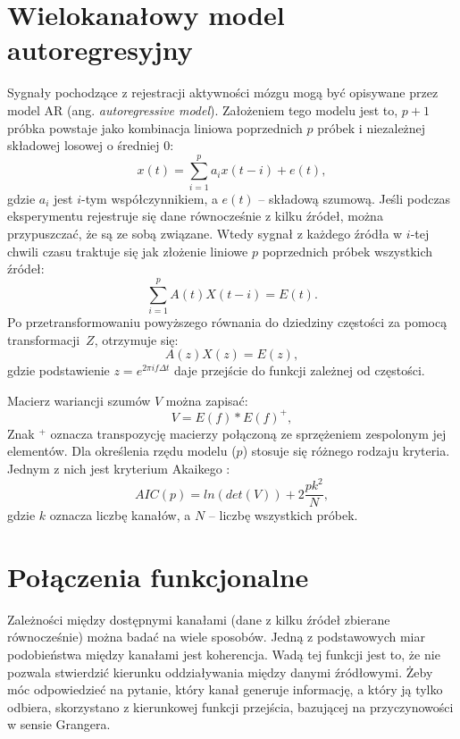 \documentclass{pracamgr}
\begin{document}
	\section{Wielokanałowy model autoregresyjny}
	Sygnały pochodzące z rejestracji aktywności mózgu mogą być opisywane przez model AR (ang. \textit{autoregressive model}). Założeniem tego modelu jest to, $p + 1$ próbka powstaje jako kombinacja liniowa poprzednich $p$ próbek i niezależnej składowej losowej o średniej 0:
	\begin{equation}
		x(t) =  \sum_{i=1}^{p}a_ix(t-i) + e(t),
	\end{equation}
	gdzie $a_i$ jest $i$-tym współczynnikiem, a $e(t)$ -- składową szumową. \newline
	Jeśli podczas eksperymentu rejestruje się dane równocześnie z kilku źródeł, można przypuszczać, że są ze sobą związane. Wtedy sygnał z każdego źródła w $i$-tej chwili czasu traktuje się jak złożenie liniowe $p$ poprzednich próbek wszystkich źródeł:
	\begin{equation}
		\sum_{i=1}^{p}A(t)X(t-i) = E(t).
	\end{equation}
	Po przetransformowaniu powyższego równania do dziedziny częstości za pomocą transformacji~$Z$, otrzymuje się:
	\begin{equation}
		A(z)X(z) = E(z),
	\end{equation}
	gdzie podstawienie $z = e^{2\pi if\Delta t}$ daje przejście do funkcji zależnej od częstości.
	
	Macierz wariancji szumów $V$ można zapisać:
	\begin{equation}
		V = E(f)*E(f)^{+},
	\end{equation}
	Znak $^{+}$ oznacza transpozycję macierzy połączoną ze sprzężeniem zespolonym jej elementów.
	Dla określenia rzędu modelu ($p$) stosuje się różnego rodzaju kryteria. Jednym z nich jest kryterium Akaikego \citep[s. 79]{jarek}:
	\begin{equation}
		AIC(p) = ln(det(V))+2\frac{pk^2}{N},
	\end{equation}
	gdzie $k$ oznacza liczbę kanałów, a $N$ -- liczbę wszystkich próbek.
	\section{Połączenia funkcjonalne}
	Zależności między dostępnymi kanałami (dane z kilku źródeł zbierane równocześnie) można badać na wiele sposobów. Jedną z podstawowych miar podobieństwa między kanałami jest koherencja. Wadą tej funkcji jest to, że nie pozwala stwierdzić kierunku oddziaływania między danymi źródłowymi. Żeby móc odpowiedzieć na pytanie, który kanał generuje informację, a który ją tylko odbiera, skorzystano z kierunkowej funkcji przejścia, bazującej na przyczynowości w sensie Grangera.
	
\end{document}
